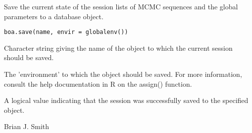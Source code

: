 \begin{Description}\relax
Save the current state of the session lists of MCMC sequences and the global 
parameters to a database object.
\end{Description}
\begin{Usage}
\begin{verbatim}
boa.save(name, envir = globalenv())
\end{verbatim}
\end{Usage}
\begin{Arguments}
\begin{ldescription}
\item[\code{name}] Character string giving the name of the object to which the 
current session should be saved.
\item[\code{envir}] The 'environment' to which the object should be saved. For more 
information, consult the help documentation in R on the assign() function.
\end{ldescription}
\end{Arguments}
\begin{Value}
A logical value indicating that the session was successfully saved to the specified object.
\end{Value}
\begin{Author}\relax
Brian J. Smith
\end{Author}

